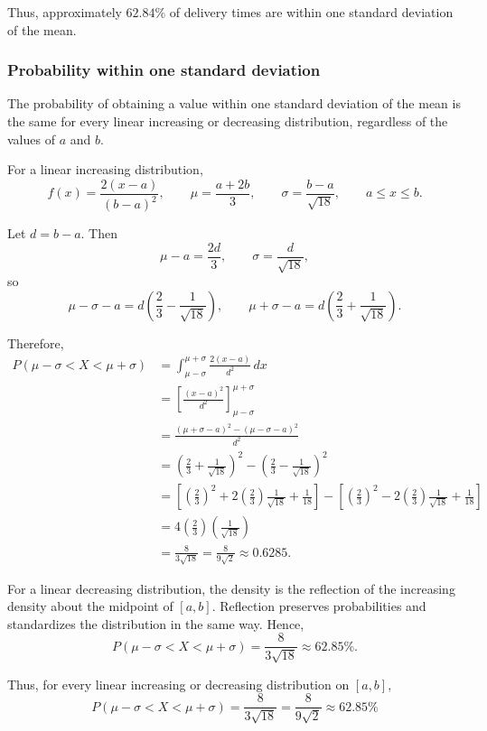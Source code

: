 Thus, approximately $62.84\%$ of delivery times are within one
standard deviation of the mean.

\subsubsection{Probability within one standard deviation}

The probability of obtaining a value within one standard deviation of the
mean is the same for every linear increasing or decreasing distribution,
regardless of the values of $a$ and $b$.

For a linear increasing distribution,
\[
f(x)=\frac{2(x-a)}{(b-a)^2},
\qquad
\mu=\frac{a+2b}{3},
\qquad
\sigma=\frac{b-a}{\sqrt{18}},
\qquad a\le x\le b.
\]

Let $d=b-a$. Then
\[
\mu-a=\frac{2d}{3},
\qquad
\sigma=\frac{d}{\sqrt{18}},
\]
so
\[
\mu-\sigma-a
=d\left(\frac23-\frac{1}{\sqrt{18}}\right),
\qquad
\mu+\sigma-a
=d\left(\frac23+\frac{1}{\sqrt{18}}\right).
\]

Therefore,
\begin{align*}
	P(\mu-\sigma<X<\mu+\sigma)
	&=
	\int_{\mu-\sigma}^{\mu+\sigma}
	\frac{2(x-a)}{d^2}\,dx
	\\
	&=
	\left[
	\frac{(x-a)^2}{d^2}
	\right]_{\mu-\sigma}^{\mu+\sigma}
	\\
	&=
	\frac{(\mu+\sigma-a)^2-(\mu-\sigma-a)^2}{d^2}
	\\
	&=
	\left(\frac23+\frac{1}{\sqrt{18}}\right)^2
	-
	\left(\frac23-\frac{1}{\sqrt{18}}\right)^2
	\\
	&=
	\left[
	\left(\frac23\right)^2
	+2\left(\frac23\right)\frac{1}{\sqrt{18}}
	+\frac1{18}
	\right]
	-
	\left[
	\left(\frac23\right)^2
	-2\left(\frac23\right)\frac{1}{\sqrt{18}}
	+\frac1{18}
	\right]
	\\
	&=
	4\left(\frac23\right)\left(\frac{1}{\sqrt{18}}\right)
	\\
	&=
	\frac{8}{3\sqrt{18}}
	=
	\frac{8}{9\sqrt{2}}
	\approx 0.6285.
\end{align*}

For a linear decreasing distribution, the density is the reflection of the
increasing density about the midpoint of $[a,b]$. Reflection preserves
probabilities and standardizes the distribution in the same way. Hence,
\[
P(\mu-\sigma<X<\mu+\sigma)
=
\frac{8}{3\sqrt{18}}
\approx 62.85\%.
\]

Thus, for every linear increasing or decreasing distribution on $[a,b]$,
\[
\boxed{
	P(\mu-\sigma<X<\mu+\sigma)
	=
	\frac{8}{3\sqrt{18}}
	=
	\frac{8}{9\sqrt{2}}
	\approx 62.85\%
}
\]

